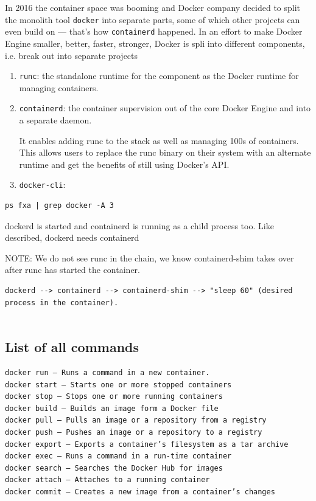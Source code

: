 In 2016 the container space was booming and Docker company decided to split the monolith
tool \verb!docker! into separate parts, some of which other projects can even
build on — that’s how \verb!containerd! happened. In an effort to make Docker Engine
smaller, better, faster, stronger, Docker is spli into different components,
i.e. break out into separate projects
\begin{enumerate}
  \item  \verb!runc!:  the standalone runtime for the component as the Docker runtime for managing containers.
  
  \item \verb!containerd!:  the container supervision out of the core Docker Engine and into a separate daemon. 
  
  It enables adding runc to the stack as well as managing 100s of containers.
   This allows users to replace the runc binary on their system with an
   alternate runtime and get the benefits of still using Docker’s API.
  
  \item \verb!docker-cli!: 
\end{enumerate}

\begin{verbatim}
ps fxa | grep docker -A 3  

\end{verbatim}
dockerd is started and containerd is running as a child process too. Like described, dockerd needs containerd 

NOTE: We do not see runc in the chain, we know containerd-shim takes over after runc has started the container. 
\begin{verbatim}
dockerd --> containerd --> containerd-shim --> "sleep 60" (desired process in the container).


\end{verbatim}

\subsection{List of all commands}
\label{sec:docker-commands}

\begin{verbatim}
docker run – Runs a command in a new container.
docker start – Starts one or more stopped containers
docker stop – Stops one or more running containers
docker build – Builds an image form a Docker file
docker pull – Pulls an image or a repository from a registry
docker push – Pushes an image or a repository to a registry
docker export – Exports a container’s filesystem as a tar archive
docker exec – Runs a command in a run-time container
docker search – Searches the Docker Hub for images
docker attach – Attaches to a running container
docker commit – Creates a new image from a container’s changes
\end{verbatim}

